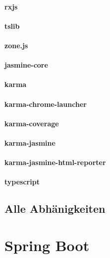 \paragraph{rxjs}

\paragraph{tslib}

\paragraph{zone.js}

\paragraph{jasmine-core}

\paragraph{karma}

\paragraph{karma-chrome-launcher}

\paragraph{karma-coverage}

\paragraph{karma-jasmine}

\paragraph{karma-jasmine-html-reporter}

\paragraph{typescript}


\subsection{Alle Abhänigkeiten}

\section{Spring Boot}\label{sec:spring-boot}

